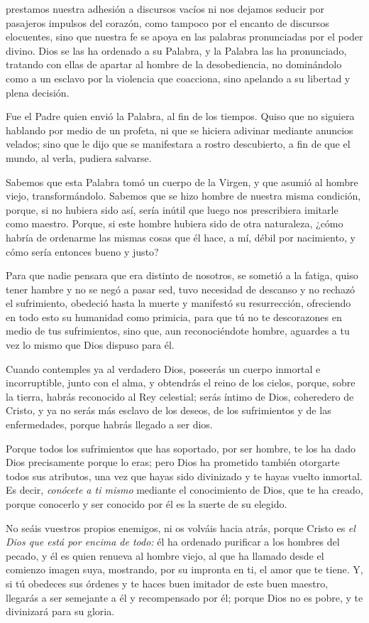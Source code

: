 \begin{body}
	 prestamos nuestra adhesión a discursos vacíos ni nos dejamos seducir por pasajeros impulsos del corazón, como tampoco por el encanto de discursos elocuentes, sino que nuestra fe se apoya en las palabras pronunciadas por el poder divino. Dios se las ha ordenado a su Palabra, y la Palabra las ha pronunciado, tratando con ellas de apartar al hombre de la desobediencia, no dominándolo como a un esclavo por la violencia que coacciona, sino apelando a su libertad y plena decisión.
	
	Fue el Padre quien envió la Palabra, al fin de los tiempos. Quiso que no siguiera hablando por medio de un profeta, ni que se hiciera adivinar mediante anuncios velados; sino que le dijo que se manifestara a rostro descubierto, a fin de que el mundo, al verla, pudiera salvarse.
	
	Sabemos que esta Palabra tomó un cuerpo de la Virgen, y que asumió al hombre viejo, transformándolo. Sabemos que se hizo hombre de nuestra misma condición, porque, si no hubiera sido así, sería inútil que luego nos prescribiera imitarle como maestro. Porque, si este hombre hubiera sido de otra naturaleza, ¿cómo habría de ordenarme las mismas cosas que él hace, a mí, débil por nacimiento, y cómo sería entonces bueno y justo?
	
	Para que nadie pensara que era distinto de nosotros, se sometió a la fatiga, quiso tener hambre y no se negó a pasar sed, tuvo necesidad de descanso y no rechazó el sufrimiento, obedeció hasta la muerte y manifestó su resurrección, ofreciendo en todo esto su humanidad como primicia, para que tú no te descorazones en medio de tus sufrimientos, sino que, aun reconociéndote hombre, aguardes a tu vez lo mismo que Dios dispuso para él.
	
	Cuando contemples ya al verdadero Dios, poseerás un cuerpo inmortal e incorruptible, junto con el alma, y obtendrás el reino de los cielos, porque, sobre la tierra, habrás reconocido al Rey celestial; serás íntimo de Dios, coheredero de Cristo, y ya no serás más esclavo de los deseos, de los sufrimientos y de las enfermedades, porque habrás llegado a ser dios.
	
	Porque todos los sufrimientos que has soportado, por ser hombre, te los ha dado Dios precisamente porque lo eras; pero Dios ha prometido también otorgarte todos sus atributos, una vez que hayas sido divinizado y te hayas vuelto inmortal. Es decir, \emph{conócete a ti mismo} mediante el conocimiento de Dios, que te ha creado, porque conocerlo y ser conocido por él es la suerte de su elegido.
	
	No seáis vuestros propios enemigos, ni os volváis hacia atrás, porque Cristo es \emph{el Dios que está por encima de todo:} él ha ordenado purificar a los hombres del pecado, y él es quien renueva al hombre viejo, al que ha llamado desde el comienzo imagen suya, mostrando, por su impronta en ti, el amor que te tiene. Y, si tú obedeces sus órdenes y te haces buen imitador de este buen maestro, llegarás a ser semejante a él y recompensado por él; porque Dios no es pobre, y te divinizará para su gloria.
\end{body}

